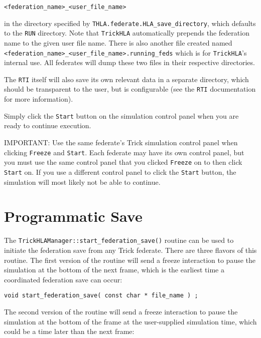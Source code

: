\begin{verbatim}
<federation_name>_<user_file_name>
\end{verbatim}

in the directory specified by {\tt THLA.federate.HLA\_save\_directory}, which defaults to the {\tt RUN}
directory. Note that {\tt TrickHLA} automatically prepends the federation name to the given user file name.
There is also another file created named {\tt <federation\_name>\_<user\_file\_name>.running\_feds} which
is for {\tt TrickHLA}'s internal use. All federates will dump these two files in their respective directories.

The {\tt RTI} itself will also save its own relevant data in a separate directory, which should be transparent to the user, 
but is configurable (see the {\tt RTI} documentation for more information).

Simply click the {\tt Start} button on the simulation control panel when you are ready to continue execution.

IMPORTANT: Use the same federate's Trick simulation control panel when clicking {\tt Freeze} and {\tt Start}.
Each federate may have its own control panel, but you must use the same control panel that you clicked {\tt Freeze}
on to then click {\tt Start} on. If you use a different control panel to click the {\tt Start} button, the simulation will most
likely not be able to continue.

\section{Programmatic Save }
\label{sec:prog_save}

The {\tt TrickHLAManager::start\_federation\_save()}
routine can be used to initiate the federation
save from any Trick federate. There are three flavors of this routine.
The first version of the routine will send a freeze interaction to pause the
simulation at the bottom of the next frame, which is the earliest time a
coordinated federation save can occur:

\begin{verbatim}
void start_federation_save( const char * file_name ) ;
\end{verbatim}

The second version of the routine will send a freeze interaction to pause the
simulation at the bottom of the frame at the user-supplied simulation time,
which could be a time later than the next frame:

